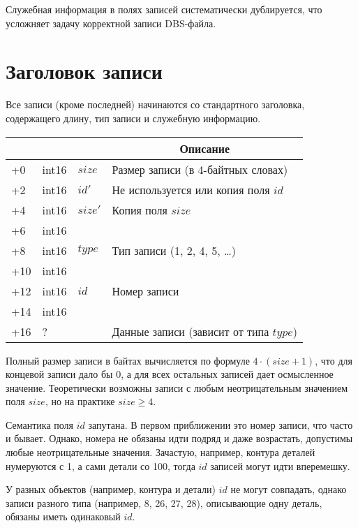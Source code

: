 Служебная информация в полях записей систематически дублируется,
что усложняет задачу корректной записи DBS-файла.

\section*{Заголовок записи}

Все записи
(кроме последней)
начинаются со стандартного заголовка,
содержащего длину, тип записи
и служебную информацию.

\newcommand{\dbsRecord}[1]{
  \noindent
  \begin{tabularx}{\textwidth}{|>{\raggedleft}p{3em}|>{\centering}p{4em}|>{\centering}p{4em}|X|}
    \hline
    \multicolumn{1}{|c|}{Смещение} &
    \multicolumn{1}{c|}{Тип}      &
    \multicolumn{1}{c|}{Имя}      &
    \multicolumn{1}{c|}{Описание}     \\
    \hline
    #1
    \hline
  \end{tabularx}
}

\dbsRecord{
  +0  & int16 & $size$ & Размер записи (в 4-байтных словах) \\
  +2  & int16 & $id'$ & Не используется или копия поля $id$ \\
  +4  & int16 & $size'$ & Копия поля $size$ \\
  +6  & int16 &  &  \\
  +8  & int16 & $type$ & Тип записи (1, 2, 4, 5, \dots) \\
  +10 & int16 &  &  \\
  +12 & int16 & $id$ & Номер записи \\
  +14 & int16 &  &  \\
  +16 & ?     &  & Данные записи (зависит от типа $type$)  \\
}

Полный размер записи в байтах вычисляется по формуле
$4 \cdot (size+1)$,
что для концевой записи дало бы 0,
а для всех остальных записей дает осмысленное значение.
Теоретически возможны записи с любым неотрицательным значением поля
$size$,
но на практике
$size \geqslant 4$.

Семантика поля $id$ запутана.
В первом приближении это номер записи, что часто и бывает.
Однако, номера не обязаны идти подряд и даже возрастать,
допустимы любые неотрицательные значения.
Зачастую, например, контура деталей нумеруются с 1,
а сами детали со 100,
тогда $id$ записей могут идти вперемешку.

У разных объектов
(например, контура и детали)
$id$
не могут совпадать,
однако записи разного типа
(например, 8, 26, 27, 28),
описывающие одну деталь,
обязаны иметь одинаковый
$id$.

